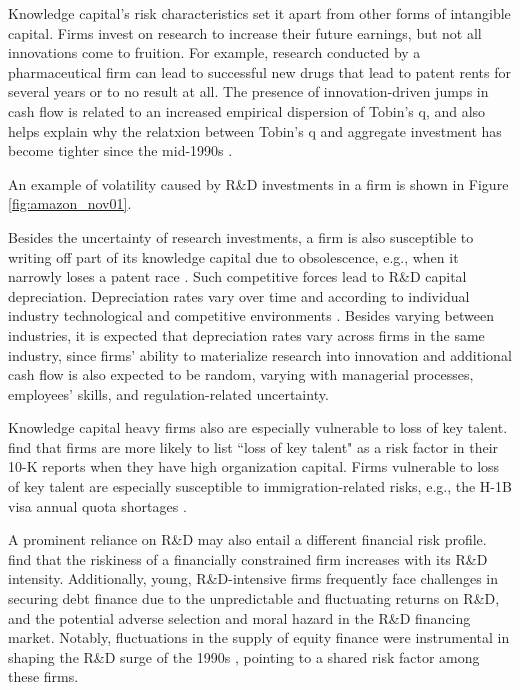 \documentclass[12pt, letterpaper]{article}
\begin{document}
Knowledge capital's risk characteristics set it apart from other forms of intangible capital. Firms invest on research to increase their future earnings, but not all innovations come to fruition. For example, research conducted by a pharmaceutical firm can lead to successful new drugs that lead to patent rents for several years or to no result at all. The presence of innovation-driven jumps in cash flow is related to an increased empirical dispersion of Tobin's q, and also helps explain why the relatxion between Tobin's q and aggregate investment has become tighter since the mid-1990s \citep{Andrei2019-bh}. 

An example of volatility caused by R\&D investments in a firm is shown in Figure \ref{fig:amazon_nov01}.


Besides the uncertainty of research investments, a firm is also susceptible to writing off part of its knowledge capital due to obsolescence, e.g., when it narrowly loses a patent race \citep{Peters2017-fl}. Such competitive forces lead to R\&D capital depreciation. Depreciation rates vary over time and according to individual industry technological and competitive environments \citep{Li2020-xc}. Besides varying between industries, it is expected that depreciation rates vary across firms in the same industry, since firms' ability to materialize research into innovation and additional cash flow is also expected to be random, varying with managerial processes, employees' skills, and regulation-related uncertainty.

Knowledge capital heavy firms also are especially vulnerable to loss of key talent. \cite{Eisfeldt2013-ad} find that firms are more likely to list ``loss of key talent" as a risk factor in their 10-K reports when they have high organization capital. Firms vulnerable to loss of key talent are especially susceptible to immigration-related risks, e.g., the H-1B visa annual quota shortages \citep{Peri2015-qt}. 

A prominent reliance on R\&D may also entail a different financial risk profile. \cite{Li2011-ay} find that the riskiness of a financially constrained firm increases with its R\&D intensity. Additionally, young, R\&D-intensive firms frequently face challenges in securing debt finance due to the unpredictable and fluctuating returns on R\&D, and the potential adverse selection and moral hazard in the R\&D financing market. Notably, fluctuations in the supply of equity finance were instrumental in shaping the R\&D surge of the 1990s \citep{Brown2009-zp}, pointing to a shared risk factor among these firms.
\end{document}

